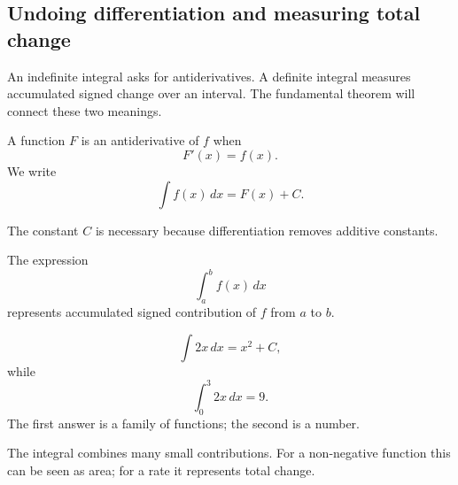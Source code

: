 \subsection{Undoing differentiation and measuring total change}

\begin{corebox}
An indefinite integral asks for antiderivatives. A definite integral measures accumulated signed change over an interval. The fundamental theorem will connect these two meanings.
\end{corebox}

\begin{definitionbox}[Antiderivative]
A function $F$ is an antiderivative of $f$ when
\[
F'(x)=f(x).
\]
We write
\[
\int f(x)\,dx=F(x)+C.
\]
\end{definitionbox}

The constant $C$ is necessary because differentiation removes additive constants.

\begin{definitionbox}
The expression
\[
\int_a^b f(x)\,dx
\]
represents accumulated signed contribution of $f$ from $a$ to $b$.
\end{definitionbox}

\begin{examplebox}
\[
\int 2x\,dx=x^2+C,
\]
while
\[
\int_0^3 2x\,dx=9.
\]
The first answer is a family of functions; the second is a number.
\end{examplebox}

\begin{interpretationbox}
The integral combines many small contributions. For a non-negative function this can be seen as area; for a rate it represents total change.
\end{interpretationbox}
